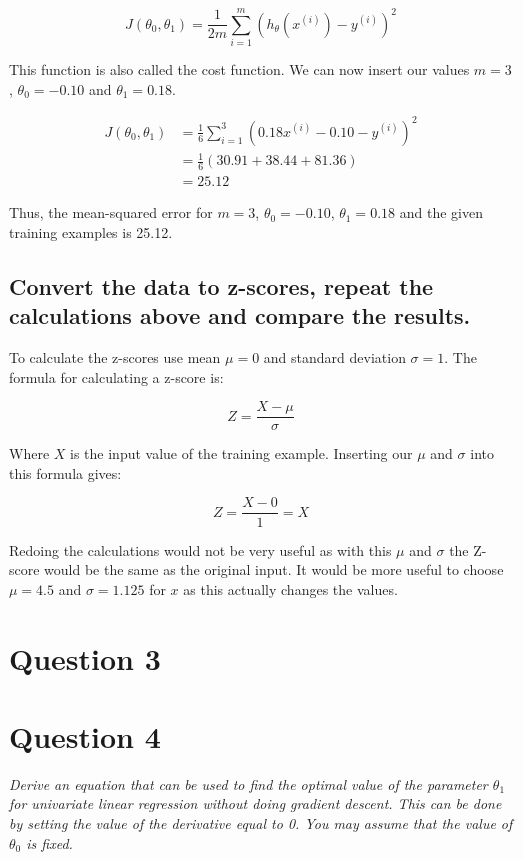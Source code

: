 \documentclass[12pt, a4paper]{article}
\begin{document}
		\begin{equation*}
		J(\theta_0, \theta_1) = \frac{1}{2m} \sum\limits_{i=1}^m (h _{\theta} (x ^{(i)}) - y ^{(i)})^2
		\end{equation*}
		
		This function is also called the cost function. We can now insert our values $m=3$, $\theta_0=-0.10$ and $\theta_1=0.18$.
		
		\begin{align*}
		J(\theta_0, \theta_1) &= \frac{1}{6} \sum\limits_{i=1}^3 (0.18x ^{(i)} - 0.10 - y ^{(i)})^2\\
		 &= \frac{1}{6} (30.91+38.44+81.36)\\
		&=25.12
		\end{align*}
		
		Thus, the mean-squared error for $m=3$, $\theta_0=-0.10$, $\theta_1=0.18$ and the given training examples is 25.12.
	
	\subsection{Convert the data to z-scores, repeat the calculations above and compare the results.}
	To calculate the z-scores use mean $\mu=0$ and standard deviation $\sigma=1$. The formula for calculating a z-score is:
	
	\begin{equation*}
	Z = \frac{X-\mu}{\sigma}
	\end{equation*}
	
	Where $X$ is the input value of the training example. Inserting our $\mu$ and $\sigma$ into this formula gives:
	
	\begin{equation*}
	Z = \frac{X-0}{1} = X
	\end{equation*}
	
	Redoing the calculations would not be very useful as with this $\mu$ and $\sigma$ the Z-score would be the same as the original input. It would be more useful to choose $\mu=4.5$ 
	and $\sigma=1.125$ for $x$ as this actually changes the values.

	\pagebreak

\section{Question 3}

\section{Question 4}
\textit{Derive an equation that can be used to find the optimal value of the parameter $\theta_1$ for
univariate linear regression without doing gradient descent. This can be done by setting the value of the
derivative equal to 0. You may assume that the value of $\theta_0$ is fixed.}
\end{document}
